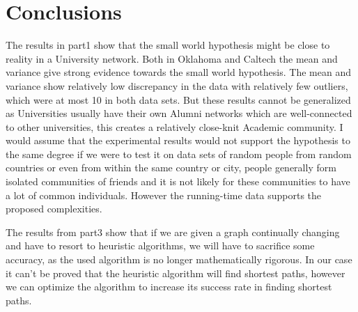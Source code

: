 \documentclass{article}
\begin{document}
\section{Conclusions}
\label{sec:conclusions}
The results in part1 show that the small world hypothesis might be close to reality in a University network.
Both in Oklahoma and Caltech the mean and variance give strong evidence towards the small world
hypothesis. The mean and variance show relatively low discrepancy in the data with relatively few outliers, which were at most 10 in both data sets. But these results cannot be generalized as Universities usually have their own Alumni networks which are well-connected to other universities, this creates a relatively
close-knit Academic community. I would assume that the experimental results would not support the hypothesis
to the same degree if we were to test it on data sets of random people from random countries or even from within the same country or city, people generally form isolated communities of friends and it is not likely for
these communities to have a lot of common individuals. However the running-time data supports the proposed complexities.\par
The results from part3 show that if we are given a graph continually changing and have
to resort to heuristic algorithms, we will have to sacrifice some accuracy, as the used
algorithm is no longer mathematically rigorous. In our case it can't be proved that the
heuristic algorithm will find shortest paths, however we can optimize the algorithm to
increase its success rate in finding shortest paths.
\end{document}

